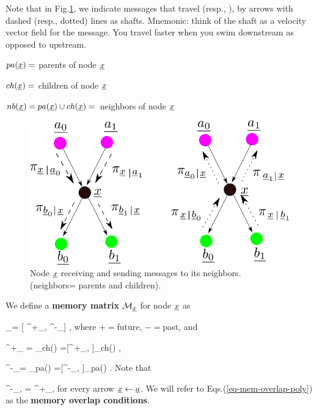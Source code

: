 Note that in Fig.\ref{fig-pi-lam},
we indicate
messages that travel
(resp., ), by
arrows with dashed (resp., dotted)
 lines as shafts.
Mnemonic: think of the shaft as a
 velocity vector field
for the message.
You travel faster when
you swim downstream as opposed
to upstream.

$pa(\rvx)=$ parents of node $\rvx$

$ch(\rvx)=$ children of node $\rvx$

$nb(\rvx)=pa(\rvx)\cup ch(\rvx)=$
neighbors of node $\rvx$



\begin{figure}[h!]
\centering
\includegraphics[width=5in]{mpass/pi-lam.png}
\caption{Node $\rvx$ receiving
and sending messages to
 its neighbors. (neighbors=
parents and children).
}
\label{fig-pi-lam}
\end{figure}


We define a {\bf memory matrix}
$\calm_{\rvx}$ for node $\rvx$
as

\beq
\calm_{\rvx}=
[
\calm^+_{\rvx},
\calm^-_{\rvx}]
\;,
\eeq
where $+=$future, $-=$past, and

\beq
\calm^+_{ \rvx}=
_{\rvb\in ch(\rvx)}
=[\calm^+_{\rvb, \rvx}]_{\rvb\in ch(\rvx)}
\;,
\eeq

\beq
\calm^-_{\rvx}=
_{\rva\in  pa(\rvx)}
=[\calm^-_{\rvx, \rva}]_{\rva\in pa(\rvx)}
\;.
\eeq
Note that

\beq
\calm^-_{\rvx, \rva}=
\calm^+_{\rva, \rvx}
\label{eq-mem-overlap-poly}
\eeq
for every arrow $\rvx\larrow\rva$.
We will refer to
Eqs.(\ref{eq-mem-overlap-poly}) as
the {\bf memory overlap
conditions}.

